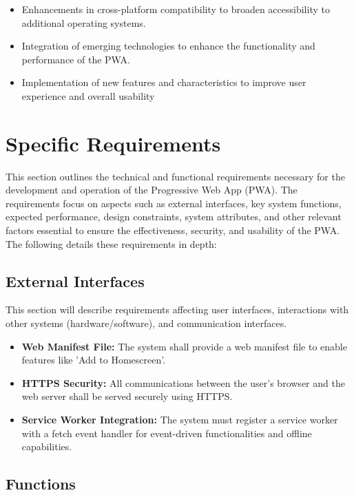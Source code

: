 \documentclass[12pt,a4paper, twosite]{article}
\begin{document}
\begin{itemize}
\item Enhancements in cross-platform compatibility to broaden accessibility to additional operating systems.
\item Integration of emerging technologies to enhance the functionality and performance of the PWA.
\item Implementation of new features and characteristics to improve user experience and overall usability  
\end{itemize}

\newpage

\section{Specific Requirements}
\label{sec:org40573d1}

This section outlines the technical and functional 
requirements necessary for the development and operation 
of the Progressive Web App (PWA). The requirements focus 
on aspects such as external interfaces, key system functions, 
expected performance, design constraints, system attributes, 
and other relevant factors essential to ensure the effectiveness, 
security, and usability of the PWA. The following details these requirements in depth:


\subsection{External Interfaces}
\label{sec:orgfd5391f}

This section will describe requirements affecting user interfaces, interactions with other systems (hardware/software), and communication interfaces.
\begin{itemize}
  \item \textbf{Web Manifest File: }The system shall provide a web manifest file to enable features like 'Add to Homescreen'.
  \item \textbf{HTTPS Security: }All communications between the user's browser and the web server shall be served securely using HTTPS.
  \item \textbf{Service Worker Integration: }The system must register a service worker with a fetch event handler for event-driven functionalities and offline capabilities.
\end{itemize}

\subsection{Functions}
\label{sec:org307bb59}
\end{document}
